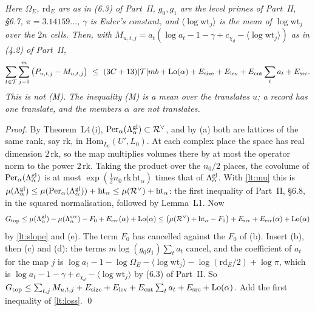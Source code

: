 \documentclass[11pt,letterpaper]{article}
\begin{document}
\emph{Here $\Omega_E$, $\mathrm{rd}_E$ are as in \textup{(6.3)} of Part~II, $g_0,g_1$ are the level primes
of Part~II, \S6.7, $\pi=3.14159\ldots$, $\gamma$ is Euler's constant, and $\langle\log\mathrm{wt}_j\rangle$ is the mean of
$\log\mathrm{wt}_j$ over the $2n$ cells. Then, with
$M_{u,t,j}=a_t(\log a_t-1-\gamma+c_{\chi_d}-\langle\log\mathrm{wt}_j\rangle)$ as in \textup{(4.2)} of
Part~II,}
\begin{equation}\label{lt:M}
 \sum_{t\in\mathcal T}\sum_{j=1}^m\big(P_{u,t,j}-M_{u,t,j}\big)\ \le\ (3C+13)|\mathcal T|mb+\mathrm{Lo}(\alpha)
 +E_{\rm size}+E_{\rm lev}+E_{\rm cnt}\sum_ta_t+E_{\rm src} .
\end{equation}
\emph{This is not \textup{(M)}. The inequality \textup{(M)} is a mean over the translates $u$; a record has
one translate, and the members $\alpha$ are not translates.}

\emph{Proof.} By Theorem~L4\,(i), $\mathrm{Per}_\alpha(\Lambda^{\rm gl}_\alpha)\subset\mathcal R^\vee$, and
by (a) both are lattices of the same rank, say $\mathrm{rk}$, in $\mathrm{Hom}_{L_0}(U',L_0)$. At each
complex place the space has real dimension $2\,\mathrm{rk}$, so the map multiplies volumes there by at
most the operator norm to the power $2\,\mathrm{rk}$. Taking the product over the $n_0/2$ places, the
covolume of $\mathrm{Per}_\alpha(\Lambda^{\rm gl}_\alpha)$ is at most
$\exp(\frac12n_0\,\mathrm{rk}\,\mathrm{ht}_\alpha)$ times that of $\Lambda^{\rm gl}_\alpha$. With
\eqref{lt:mu} this is
$\mu(\Lambda^{\rm gl}_\alpha)\le\mu(\mathrm{Per}_\alpha(\Lambda^{\rm gl}_\alpha))+\mathrm{ht}_\alpha\le\mu(\mathcal R^\vee)+\mathrm{ht}_\alpha$:
the first inequality of Part~II, \S6.8, in the squared normalisation, followed by Lemma~L1. Now
\begin{equation}\label{D:250}
 G_{\rm top}\le\mu(\Lambda^{\rm gl}_\alpha)-\mu(\Lambda^{\rm src}_\alpha)-F_0+E_{\rm err}(\alpha)+\mathrm{Lo}(\alpha)
 \le\big(\mu(\mathcal R^\vee)+\mathrm{ht}_\alpha-F_0\big)+E_{\rm src}+E_{\rm err}(\alpha)+\mathrm{Lo}(\alpha)
\end{equation}
by \eqref{lt:slope} and (e). The term $F_0$ has cancelled against the $F_0$ of (b). Insert (b), then (c)
and (d): the terms $m\log(g_0g_1)\sum_ta_t$ cancel, and the coefficient of $a_t$ for the map $j$ is
$\log a_t-1-\log\Omega_E-\langle\log\mathrm{wt}_j\rangle-\log(\mathrm{rd}_E/2)+\log\pi$, which is
$\log a_t-1-\gamma+c_{\chi_d}-\langle\log\mathrm{wt}_j\rangle$ by (6.3) of Part~II. So
$G_{\rm top}\le\sum_{t,j}M_{u,t,j}+E_{\rm size}+E_{\rm lev}+E_{\rm cnt}\sum_ta_t+E_{\rm src}+\mathrm{Lo}(\alpha)$.
Add the first inequality of \eqref{lt:loss}. \qed
\end{document}
